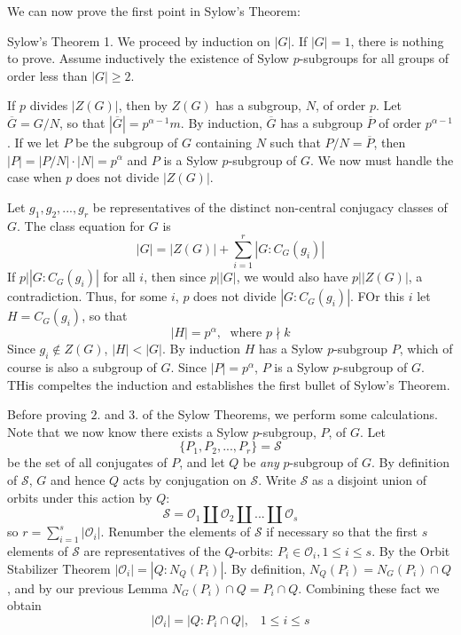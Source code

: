 \documentclass[12pt, a4paper, twoside, openright, titlepage]{book}
\begin{document}
We can now prove the first point in Sylow's Theorem:

\begin{proof*}{Sylow's Theorem 1.}{}
    We proceed by induction on $|G|$. If $|G| = 1$, there is nothing to prove. Assume inductively the existence of Sylow $p$-subgroups for all groups of order less than $|G| \geq 2$.

    If $p$ divides $|Z(G)|$, then by  $Z(G)$ has a subgroup, $N$, of order $p$. Let $\overline{G} = G/N$, so that $|\overline{G}| = p^{\alpha-1}m$. By induction, $\overline{G}$ has a subgroup $\overline{P}$ of order $p^{\alpha-1}$. If we let $P$ be the subgroup of $G$ containing $N$ such that $P/N =\overline{P}$, then $|P| = |P/N|\cdot|N| = p^{\alpha}$ and $P$ is a Sylow $p$-subgroup of $G$. We now must handle the case when $p$ does not divide $|Z(G)|$.

    Let $g_1,g_2,...,g_r$ be representatives of the distinct non-central conjugacy classes of $G$. The class equation for $G$ is \begin{equation*}
        |G| = |Z(G)| + \sum\limits_{i=1}^r|G:C_G(g_i)|
    \end{equation*}
    If $p\vert |G:C_G(g_i)|$ for all $i$, then since $p\vert |G|$, we would also have $p\vert|Z(G)|$, a contradiction. Thus, for some $i$, $p$ does not divide $|G:C_G(g_i)|$. FOr this $i$ let $H = C_G(g_i)$, so that \begin{equation*}
        |H| = p^{\alpha}, \;\text{ where }p\nmid k
    \end{equation*}
    Since $g_i \notin Z(G)$, $|H| < |G|$. By induction $H$ has a Sylow $p$-subgroup $P$, which of course is also a subgroup of $G$. Since $|P| = p^{\alpha}$, $P$ is a Sylow $p$-subgroup of $G$. THis compeltes the induction and establishes the first bullet of Sylow's Theorem.
\end{proof*}

Before proving $2.$ and $3.$ of the Sylow Theorems, we perform some calculations. Note that we now know there exists a Sylow $p$-subgroup, $P$, of $G$. Let \begin{equation*}
    \{P_1,P_2,...,P_r\} = \mathcal{S}
\end{equation*}
be the set of all conjugates of $P$, and let $Q$ be \emph{any} $p$-subgroup of $G$. By definition of $\mathcal{S}$, $G$ and hence $Q$ acts by conjugation on $\mathcal{S}$. Write $\mathcal{S}$ as a disjoint union of orbits under this action by $Q$: \begin{equation*}
    \mathcal{S} = \mathcal{O}_1\coprod\mathcal{O}_2\coprod...\coprod\mathcal{O}_s
\end{equation*}
so $r = \sum_{i=1}^s|\mathcal{O}_i|$. Renumber the elements of $\mathcal{S}$ if necessary so that the first $s$ elements of $\mathcal{S}$ are representatives of the $Q$-orbits: $P_i\in\mathcal{O}_i, 1\leq i \leq s$. By the Orbit Stabilizer Theorem $|\mathcal{O}_i| = |Q:N_Q(P_i)|$. By definition, $N_Q(P_i) = N_G(P_i)\cap Q$, and by our previous Lemma $N_G(P_i)\cap Q = P_i\cap Q$. Combining these fact we obtain \begin{equation*}
    |\mathcal{O}_i| = |Q:P_i\cap Q|,\;\;\; 1 \leq i \leq s
\end{equation*}
\end{document}
